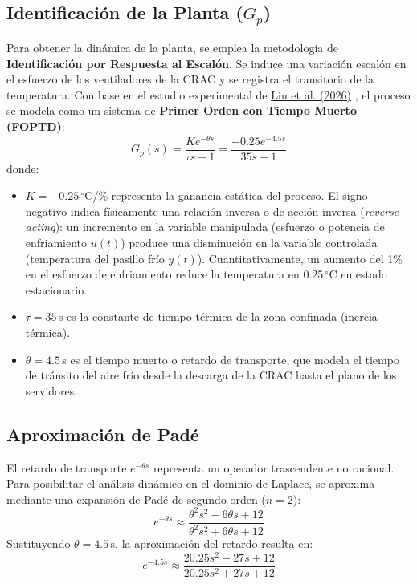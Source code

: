 \documentclass[journal,twocolumn]{IEEEtran}
\begin{document}
\subsection{Identificación de la Planta ($G_p$)}
Para obtener la dinámica de la planta, se emplea la metodología de \textbf{Identificación por Respuesta al Escalón}. Se induce una variación escalón en el esfuerzo de los ventiladores de la CRAC y se registra el transitorio de la temperatura. Con base en el estudio experimental de \href{https://doi.org/10.3390/buildings16091752}{Liu et al. (2026)} \cite{liu2026}, el proceso se modela como un sistema de \textbf{Primer Orden con Tiempo Muerto (FOPTD)}:
\begin{equation}
    G_p(s) = \frac{K e^{-\theta s}}{\tau s + 1} = \frac{-0.25 e^{-4.5 s}}{35 s + 1}
\end{equation}
donde:
\begin{itemize}
    \item $K = -0.25\,^\circ$C/\% representa la ganancia estática del proceso. El signo negativo indica físicamente una relación inversa o de acción inversa (\textit{reverse-acting}): un incremento en la variable manipulada (esfuerzo o potencia de enfriamiento $u(t)$) produce una disminución en la variable controlada (temperatura del pasillo frío $y(t)$). Cuantitativamente, un aumento del 1\% en el esfuerzo de enfriamiento reduce la temperatura en $0.25\,^\circ$C en estado estacionario.
    \item $\tau = 35$\,s es la constante de tiempo térmica de la zona confinada (inercia térmica).
    \item $\theta = 4.5$\,s es el tiempo muerto o retardo de transporte, que modela el tiempo de tránsito del aire frío desde la descarga de la CRAC hasta el plano de los servidores.
\end{itemize}

\subsection{Aproximación de Padé}
El retardo de transporte $e^{-\theta s}$ representa un operador trascendente no racional. Para posibilitar el análisis dinámico en el dominio de Laplace, se aproxima mediante una expansión de Padé de segundo orden ($n=2$):
\begin{equation}
    e^{-\theta s} \approx \frac{\theta^2 s^2 - 6\theta s + 12}{\theta^2 s^2 + 6\theta s + 12}
\end{equation}
Sustituyendo $\theta = 4.5$\,s, la aproximación del retardo resulta en:
\begin{equation}
    e^{-4.5 s} \approx \frac{20.25 s^2 - 27 s + 12}{20.25 s^2 + 27 s + 12}
\end{equation}
\end{document}
